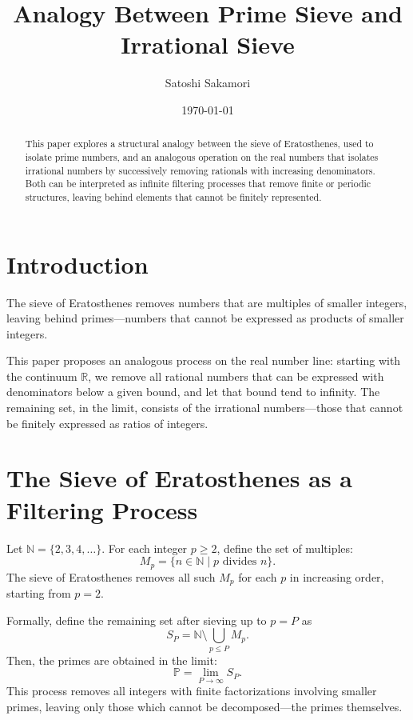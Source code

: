 \documentclass[11pt]{article}
\title{Analogy Between Prime Sieve and Irrational Sieve}
\author{Satoshi Sakamori}
\date{\today}
\begin{document}
\maketitle

\begin{abstract}
This paper explores a structural analogy between the sieve of Eratosthenes, 
used to isolate prime numbers, and an analogous operation on the real numbers 
that isolates irrational numbers by successively removing rationals 
with increasing denominators. 
Both can be interpreted as infinite filtering processes that remove 
finite or periodic structures, leaving behind elements that cannot 
be finitely represented.
\end{abstract}

\section{Introduction}

The sieve of Eratosthenes removes numbers that are multiples of smaller integers, 
leaving behind primes---numbers that cannot be expressed as products of 
smaller integers. 

This paper proposes an analogous process on the real number line:
starting with the continuum $\mathbb{R}$, 
we remove all rational numbers that can be expressed with denominators 
below a given bound, and let that bound tend to infinity. 
The remaining set, in the limit, consists of the irrational numbers---those 
that cannot be finitely expressed as ratios of integers.

\section{The Sieve of Eratosthenes as a Filtering Process}

Let $\mathbb{N} = \{2, 3, 4, \ldots\}$. 
For each integer $p \ge 2$, define the set of multiples:
\[
M_p = \{ n \in \mathbb{N} \mid p \text{ divides } n \}.
\]
The sieve of Eratosthenes removes all such $M_p$ for each $p$ in increasing order, 
starting from $p=2$.

Formally, define the remaining set after sieving up to $p = P$ as
\[
S_P = \mathbb{N} \setminus \bigcup_{p \le P} M_p.
\]
Then, the primes are obtained in the limit:
\[
\mathbb{P} = \lim_{P \to \infty} S_P.
\]
This process removes all integers with finite factorizations involving 
smaller primes, leaving only those which cannot be decomposed---the primes themselves.
\end{document}
